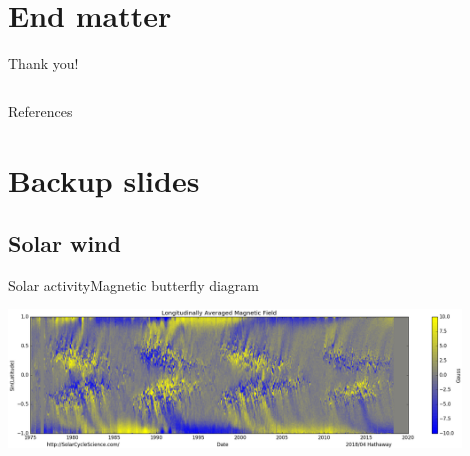 \section{End matter}

\begin{frame}[c]{Thank you!}{}
	\begin{columns}[c]
		

	\end{columns}
\end{frame}


\begin{frame}[t,allowframebreaks]{References}
	\tiny
	\begin{thebibliography}{10}
	
		\beamertemplatebookbibitems
		
		\beamertemplatearticlebibitems
		
		

	\end{thebibliography}
\end{frame}


\appendix

\section{Backup slides}

\subsection{Solar wind}

\begin{frame}[c,label=butterfly]{Solar activity}{Magnetic butterfly diagram}
	
	\centering
	\includegraphics[width=0.9\textwidth]{../figures_of_others/images/Hathaway_magbfly_201804_cropped.png}
\end{frame}

